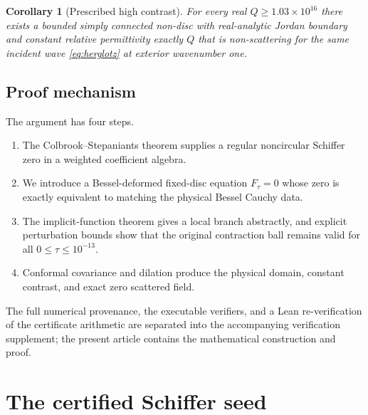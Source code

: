 \documentclass[11pt]{amsart}
\newtheorem{corollary}[theorem]{Corollary}
\begin{document}
\begin{corollary}[Prescribed high contrast]\label{cor:contrast}
For every real $Q\ge1.03\times10^{16}$ there exists a bounded simply
connected non-disc with real-analytic Jordan boundary and constant relative
permittivity exactly $Q$ that is non-scattering for the same incident wave
\eqref{eq:herglotz} at exterior wavenumber one.
\end{corollary}

\subsection{Proof mechanism}

The argument has four steps.
\begin{enumerate}[leftmargin=2.2em]
  \item The Colbrook--Stepaniants theorem supplies a regular noncircular
  Schiffer zero in a weighted coefficient algebra.
  \item We introduce a Bessel-deformed fixed-disc equation $F_\tau=0$ whose
  zero is exactly equivalent to matching the physical Bessel Cauchy data.
  \item The implicit-function theorem gives a local branch abstractly, and
  explicit perturbation bounds show that the original contraction ball
  remains valid for all $0\le\tau\le10^{-13}$.
  \item Conformal covariance and dilation produce the physical domain,
  constant contrast, and exact zero scattered field.
\end{enumerate}
The full numerical provenance, the executable verifiers, and a Lean
re-verification of the certificate arithmetic are separated into the
accompanying verification supplement; the present article contains the
mathematical construction and proof.

\section{The certified Schiffer seed}\label{sec:seed}
\end{document}
